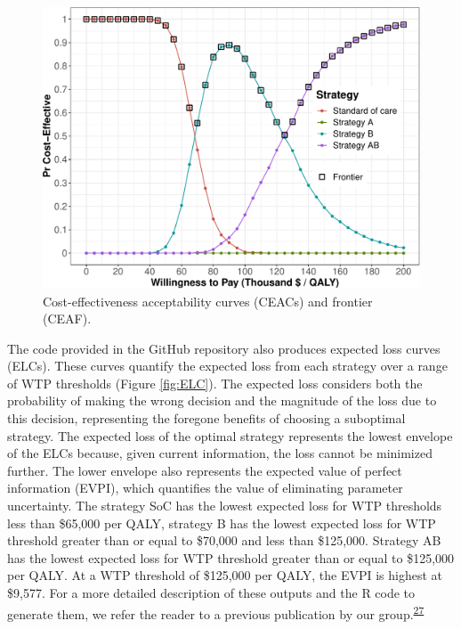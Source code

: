 \documentclass[
]{article}
\begin{document}
\begin{figure}[H]

{\centering \includegraphics{figs/CEAC-1} 

}

\caption{Cost-effectiveness acceptability curves (CEACs) and frontier (CEAF).}\label{fig:CEAC}
\end{figure}

The code provided in the GitHub repository also produces expected loss curves (ELCs). These curves quantify the expected loss from each strategy over a range of WTP thresholds (Figure \ref{fig:ELC}). The expected loss considers both the probability of making the wrong decision and the magnitude of the loss due to this decision, representing the foregone benefits of choosing a suboptimal strategy. The expected loss of the optimal strategy represents the lowest envelope of the ELCs because, given current information, the loss cannot be minimized further. The lower envelope also represents the expected value of perfect information (EVPI), which quantifies the value of eliminating parameter uncertainty. The strategy SoC has the lowest expected loss for WTP thresholds less than \$65,000 per QALY, strategy B has the lowest expected loss for WTP threshold greater than or equal to \$70,000 and less than \$125,000. Strategy AB has the lowest expected loss for WTP threshold greater than or equal to \$125,000 per QALY. At a WTP threshold of \$125,000 per QALY, the EVPI is highest at \$9,577. For a more detailed description of these outputs and the R code to generate them, we refer the reader to a previous publication by our group.\textsuperscript{\protect\hyperlink{ref-Alarid-Escudero2019}{27}}
\end{document}
